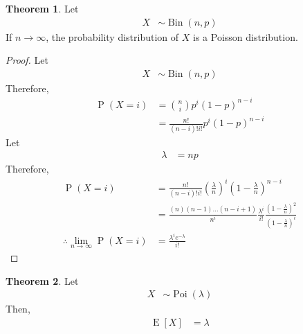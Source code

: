 \documentclass[titlepage, fleqn, a4paper, 12pt, twoside]{article}
\theoremstyle{definition}
\theoremstyle{theorem}
\newtheorem{theorem}{Theorem}
\DeclareMathOperator{\prob}{\mathrm{P}}
\DeclareMathOperator{\expct}{\mathrm{E}}
\DeclareMathOperator{\bin}{\mathrm{Bin}}
\DeclareMathOperator{\poi}{\mathrm{Poi}}
\begin{document}
\begin{theorem}
	Let
	\begin{align*}
		X & \sim \bin(n,p)
	\end{align*}
	If $n \to \infty$, the probability distribution of $X$ is a Poisson distribution.
\end{theorem}

\begin{proof}
	Let
	\begin{align*}
		X & \sim \bin(n,p)
	\end{align*}
	Therefore,
	\begin{align*}
		\prob(X = i) & = \binom{n}{i} p^i (1 - p)^{n - i} \\
                             & = \frac{n!}{(n - i)! i!} p^i (1 - p)^{n - i}
	\end{align*}
	Let
	\begin{align*}
		\lambda & = n p
	\end{align*}
	Therefore,
	\begin{align*}
		\prob(X = i)                                       & = \frac{n!}{(n - i)! i!} \left( \frac{\lambda}{n} \right)^i \left( 1 - \frac{\lambda}{n} \right)^{n - i}                                               \\
                                                                   & = \frac{(n) (n - 1) \dots (n - i + 1)}{n^i} \frac{\lambda^i}{i!} \frac{\left( 1 - \frac{\lambda}{n} \right)^2}{\left( 1 - \frac{\lambda}{n} \right)^i} \\
		\therefore \lim\limits_{n \to \infty} \prob(X = i) & = \frac{\lambda^i e^{-\lambda}}{i!}
	\end{align*}
\end{proof}

\begin{theorem}
	Let
	\begin{align*}
		X & \sim \poi(\lambda)
	\end{align*}
	Then,
	\begin{align*}
		\expct[X] & = \lambda
	\end{align*}
\end{theorem}
\end{document}
